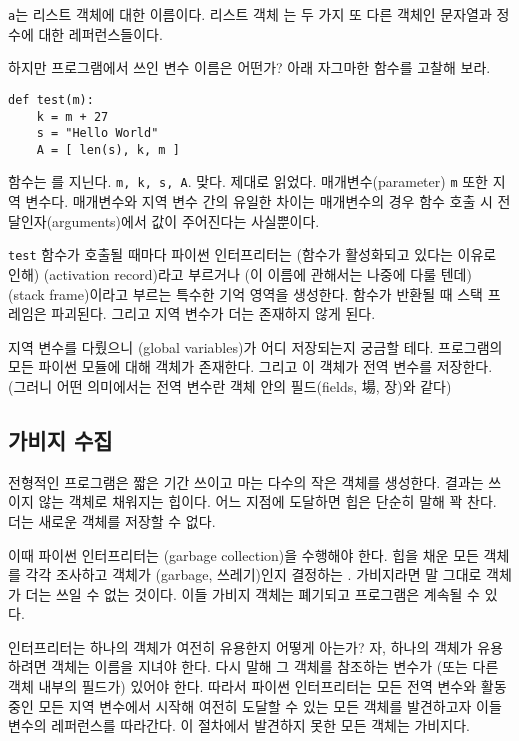 \documentclass[a4paper]{oblivoir}
\begin{document}
 \texttt{a}는 리스트 객체에 대한 이름이다. 리스트 객체 는 두 가지 또 다른 객체인 문자열과 정수에 대한 레퍼런스들이다. 

하지만 프로그램에서 쓰인 변수 이름은 어떤가? 아래 자그마한 함수를 고찰해 보라.

\begin{verbatim}
def test(m):
    k = m + 27
    s = "Hello World"
    A = [ len(s), k, m ]
\end{verbatim}

 함수는 를 지닌다. \texttt{m, k, s, A}. 맞다. 제대로 읽었다. 매개변수(parameter) \texttt{m} 또한 지역 변수다. 매개변수와 지역 변수 간의 유일한 차이는 매개변수의 경우 함수 호출 시 전달인자(arguments)에서 값이 주어진다는 사실뿐이다.

\texttt{test} 함수가 호출될 때마다 파이썬 인터프리터는 (함수가 활성화되고 있다는 이유로 인해) (activation record)라고 부르거나 (이 이름에 관해서는 나중에 다룰 텐데) (stack frame)이라고 부르는 특수한 기억 영역을 생성한다. 함수가 반환될 때 스택 프레임은 파괴된다. 그리고  지역 변수가 더는 존재하지 않게 된다.

지역 변수를 다뤘으니 (global variables)가 어디 저장되는지 궁금할 테다. 프로그램의 모든 파이썬 모듈에 대해 객체가 존재한다. 그리고 이 객체가 전역 변수를 저장한다. (그러니 어떤 의미에서는 전역 변수란 객체 안의 필드(fields, 場, 장)와 같다)

\subsection*{가비지 수집}

전형적인 프로그램은 짧은 기간 쓰이고 마는 다수의 작은 객체를 생성한다. 결과는 쓰이지 않는 객체로 채워지는 힙이다. 어느 지점에 도달하면 힙은 단순히 말해 꽉 찬다. 더는 새로운 객체를 저장할 수 없다.

이때 파이썬 인터프리터는 (garbage collection)을 수행해야 한다.  힙을 채운 모든 객체를 각각 조사하고 객체가 (garbage, 쓰레기)인지 결정하는 . 가비지라면 말 그대로 객체가 더는 쓰일 수 없는 것이다. 이들 가비지 객체는 폐기되고 프로그램은 계속될 수 있다.

인터프리터는 하나의 객체가 여전히 유용한지 어떻게 아는가? 자, 하나의 객체가 유용하려면 객체는 이름을 지녀야 한다. 다시 말해 그 객체를 참조하는 변수가 (또는 다른 객체 내부의 필드가) 있어야 한다. 따라서 파이썬 인터프리터는 모든 전역 변수와 활동 중인 모든 지역 변수에서 시작해 여전히 도달할 수 있는 모든 객체를 발견하고자 이들 변수의 레퍼런스를 따라간다. 이 절차에서 발견하지 못한 모든 객체는 가비지다.
\end{document}
